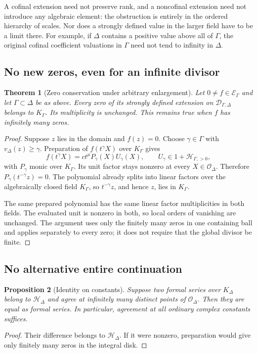 \documentclass[11pt,letterpaper]{article}
\numberwithin{equation}{section}
\newtheorem{theorem}{Theorem}[section]
\newtheorem{proposition}[theorem]{Proposition}
\theoremstyle{definition}
\theoremstyle{remark}
\begin{document}
A cofinal extension need not preserve rank, and a noncofinal extension need
not introduce any algebraic element: the obstruction is entirely in the
ordered hierarchy of scales. Nor does a strongly defined value in the larger
field have to be a limit there. For example, if $\Delta$ contains a positive
value above all of $\Gamma$, the original cofinal coefficient valuations in
$\Gamma$ need not tend to infinity in $\Delta$.

\subsection{No new zeros, even for an infinite divisor}
\begin{theorem}[Zero conservation under arbitrary enlargement]
\label{thm:zero-conservation}
Let $0\ne f\in\mathcal E_\Gamma$ and let $\Gamma\subset\Delta$ be as above.
Every zero of its strongly defined extension on
$\mathcal D_{\Gamma,\Delta}$ belongs to $K_\Gamma$. Its multiplicity is
unchanged. This remains true when $f$ has infinitely many zeros.
\end{theorem}
\begin{proof}
Suppose $z$ lies in the domain and $f(z)=0$. Choose $\gamma\in\Gamma$
with $v_\Delta(z)\ge\gamma$. Preparation of $f(t^\gamma X)$ over
$K_\Gamma$ gives
\[
 f(t^\gamma X)=ct^\mu P_\gamma(X)U_\gamma(X),
 \qquad U_\gamma\in1+\mathcal H_{\Gamma,>0},
\]
with $P_\gamma$ monic over $K_\Gamma$. Its unit factor stays nonzero at
every $X\in\mathcal O_\Delta$. Therefore
$P_\gamma(t^{-\gamma}z)=0$. The polynomial already splits into linear
factors over the algebraically closed field $K_\Gamma$, so
$t^{-\gamma}z$, and hence $z$, lies in $K_\Gamma$.

The same prepared polynomial has the same linear factor multiplicities in
both fields. The evaluated unit is nonzero in both, so local orders of
vanishing are unchanged. The argument uses only the finitely many zeros
in one containing ball and applies separately to every zero; it does not
require that the global divisor be finite.
\end{proof}

\subsection{No alternative entire continuation}
\begin{proposition}[Identity on constants]\label{prop:identity}
Suppose two formal series over $K_\Delta$ belong to
$\mathcal H_\Delta$ and agree at infinitely many distinct points of
$\mathcal O_\Delta$. Then they are equal as formal series.
In particular, agreement at all ordinary complex constants suffices.
\end{proposition}
\begin{proof}
Their difference belongs to $\mathcal H_\Delta$. If it were nonzero,
preparation would give only finitely many zeros in the integral disk.
\end{proof}
\end{document}
